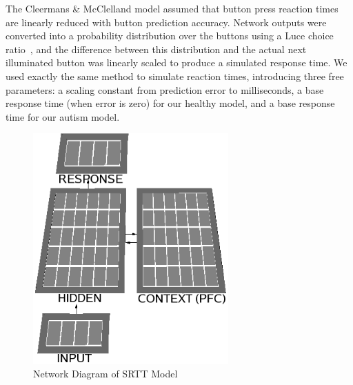 The Cleermans \& McClelland model assumed that button press reaction times are linearly reduced with button prediction accuracy. Network outputs were converted into a probability distribution over the buttons using a Luce choice ratio~\cite{LuceRD:1963:Ratio}, and the difference between this distribution and the actual next illuminated button was linearly scaled to produce a simulated response time. We used exactly the same method to simulate reaction times, introducing three free parameters: a scaling constant from prediction error to milliseconds, a base response time (when error is zero) for our healthy model, and a base response time for our autism model.


\begin{figure}[t]
\begin{center}
	\includegraphics[width=75mm]{figures/srtt_network.eps}
\end{center}
\caption{Network Diagram of SRTT Model} 
\label{network-diagram-srtt}
\end{figure}

